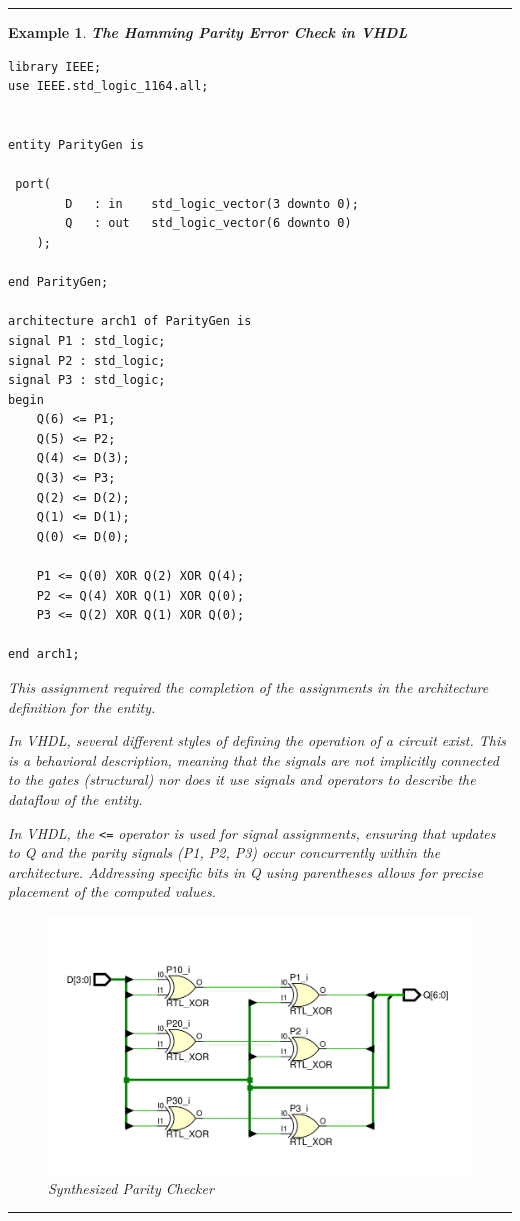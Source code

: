 \documentclass[12pt]{article}
\newtheorem{example}{Example}
\newenvironment{examp}
{
	\vspace{.5cm}
	\hrule
\begin{example}\upshape}
	{\hrule
		\vspace{0.5cm}
\end{example}}
\begin{document}
\begin{examp}
	\vspace{.5cm}
	\textbf{The Hamming Parity Error Check in VHDL}\\
	\begin{verbatim}
library IEEE;
use IEEE.std_logic_1164.all;


entity ParityGen is 

 port(
		D	: in	std_logic_vector(3 downto 0);
		Q	: out	std_logic_vector(6 downto 0)
	);

end ParityGen;

architecture arch1 of ParityGen is
signal P1 : std_logic;
signal P2 : std_logic;
signal P3 : std_logic;
begin
	Q(6) <= P1;
	Q(5) <= P2;
	Q(4) <= D(3);
	Q(3) <= P3;
	Q(2) <= D(2);
	Q(1) <= D(1);
	Q(0) <= D(0);
	
	P1 <= Q(0) XOR Q(2) XOR Q(4); 
	P2 <= Q(4) XOR Q(1) XOR Q(0); 
	P3 <= Q(2) XOR Q(1) XOR Q(0); 

end arch1;
		\end{verbatim}
	This assignment required the completion of the assignments in the
	architecture definition for the entity. 
	
	In VHDL, several different styles
	of defining the operation of a circuit exist. This is a \textit{behavioral}
	description, meaning that the signals are not implicitly connected to the
	gates (structural) nor does it use signals and operators to describe the
	dataflow of the entity.
	
	In VHDL, the \texttt{<=} operator is used for signal assignments, ensuring that updates
	to Q and the parity signals (P1, P2, P3) occur concurrently within the
	architecture. Addressing specific bits in Q using parentheses allows for
	precise placement of the computed values.
	\begin{figure}[H]
		\centering
		\includegraphics[scale=.55]{examp121}
		\caption{Synthesized Parity Checker}
	\end{figure}
	
\end{examp}
\end{document}

